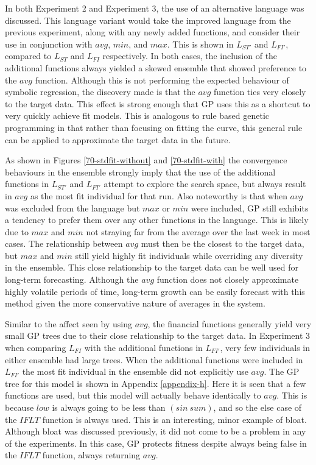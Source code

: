 \documentclass[12pt, letterpaper]{article}
\begin{document}
\textrm{ \indent In both Experiment 2 and Experiment 3, the use of an alternative language was discussed. This language variant would take the improved language from the previous experiment, along with any newly added functions, and consider their use in conjunction with $avg$, $min$, and $max$. This is shown in $L_{ST'}$ and $L_{FI'}$, compared to $L_{ST}$ and $L_{FI}$ respectively. In both cases, the inclusion of the additional functions always yielded a skewed ensemble that showed preference to the $avg$ function. Although this is not performing the expected behaviour of symbolic regression, the discovery made is that the $avg$ function ties very closely to the target data. This effect is strong enough that GP uses this as a shortcut to very quickly achieve fit models. This is analogous to rule based genetic programming in that rather than focusing on fitting the curve, this general rule can be applied to approximate the target data in the future. }

\textrm{ \indent As shown in Figures \ref{70-stdfit-without} and \ref{70-stdfit-with} the convergence behaviours in the ensemble strongly imply that the use of the additional functions in $L_{ST'}$ and $L_{FI'}$ attempt to explore the search space, but always result in $avg$ as the most fit individual for that run. Also noteworthy is that when $avg$ was excluded from the language but $max$ or $min$ were included, GP still exhibits a tendency to prefer them over any other functions in the language. This is likely due to $max$ and $min$ not straying far from the average over the last week in most cases. The relationship between $avg$ must then be the closest to the target data, but $max$ and $min$ still yield highly fit individuals while overriding any diversity in the ensemble. This close relationship to the target data can be well used for long-term forecasting. Although the $avg$ function does not closely approximate highly volatile periods of time, long-term growth can be easily forecast with this method given the more conservative nature of averages in the system.  }

\textrm{ \indent Similar to the affect seen by using $avg$, the financial functions generally yield very small GP trees due to their close relationship to the target data. In Experiment 3 when comparing $L_{FI}$ with the additional functions in $L_{FI'}$, very few individuals in either ensemble had large trees. When the additional functions were included in $L_{FI'}$ the most fit individual in the ensemble did not explicitly use $avg$. The GP tree for this model is shown in Appendix \ref{appendix-h}. Here it is seen that a few functions are used, but this model will actually behave identically to $avg$. This is because $low$ is always going to be less than $(sin\ sum)$, and so the else case of the $IFLT$ function is always used. This is an interesting, minor example of bloat. Although bloat was discussed previously, it did not come to be a problem in any of the experiments. In this case, GP protects fitness despite always being false in the $IFLT$ function, always returning $avg$.  }
\end{document}
